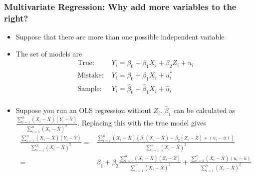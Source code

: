 \documentclass[aspectratio=169]{beamer}
\begin{document}
\begin{frame}
\frametitle{Multivariate Regression: Why add more variables to the right?}
\begin{itemize}
\item Suppose that there are more than one possible independent variable
\item The set of models are
\[
\begin{aligned}
\text{True: }& Y_i = \beta_0 + \beta_1 X_i + \beta_2 Z_i+u_i\\
\text{Mistake: }& Y_i = \beta_0 + \beta_1 X_i + u_i^*\\
\text{Sample: }& Y_i = \hat{\beta}_0 + \hat{\beta}_1 X_i+ \hat{u}_i\\
\end{aligned}
\]
\item Suppose you run an OLS regression without $Z_i$.  $\hat{\beta}_1$ can be calculated as $\frac{\sum_{i=1}^n(X_i-\bar{X})(Y_i-\bar{Y})}{\sum_{i=1}^n(X_i-\bar{X})^2}$. Replacing this with the true model gives
\footnotesize{\[
\begin{aligned}
\frac{\sum_{i=1}^n(X_i-\bar{X})(Y_i-\bar{Y})}{\sum_{i=1}^n(X_i-\bar{X})^2} =& \frac{\sum_{i=1}^n(X_i-\bar{X})(\beta_1(X_i-\bar{X})+\beta_2(Z_i-\bar{Z})+(u_i-\bar{u}))}{\sum_{i=1}^n(X_i-\bar{X})^2}\\
=& \beta_1 + \beta_2\frac{\sum_{i=1}^n(X_i-\bar{X})(Z_i-\bar{Z})}{\sum_{i=1}^n(X_i-\bar{X})^2}+\frac{\sum_{i=1}^n(X_i-\bar{X})(u_i-\bar{u})}{\sum_{i=1}^n(X_i-\bar{X})^2}\\
\end{aligned}
\]}\normalsize
\end{itemize}
\end{frame}
\end{document}
